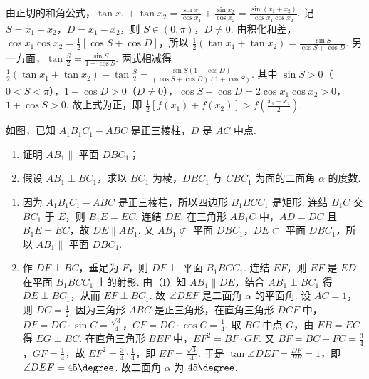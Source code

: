 \begin{solution}
由正切的和角公式，\(\tan x_1 + \tan x_2 = \frac{\sin x_1}{\cos x_1} + \frac{\sin x_2}{\cos x_2} = \frac{\sin \left(x_1 + x_2\right)}{\cos x_1 \cos x_2}\). 记 \(S = x_1 + x_2\)，\(D = x_1 - x_2\)，则 \(S \in (0, \pi)\)，\(D \neq 0\). 由积化和差，\(\cos x_1 \cos x_2 = \frac{1}{2}\left[\cos S + \cos D\right]\)，所以 \(\frac{1}{2}\left(\tan x_1 + \tan x_2\right) = \frac{\sin S}{\cos S + \cos D}\). 另一方面，\(\tan \frac{S}{2} = \frac{\sin S}{1 + \cos S}\). 两式相减得 \(\frac{1}{2}\left(\tan x_1 + \tan x_2\right) - \tan \frac{S}{2} = \frac{\sin S\left(1 - \cos D\right)}{\left(\cos S + \cos D\right)\left(1 + \cos S\right)}\). 其中 \(\sin S > 0\)（\(0 < S < \pi\)），\(1 - \cos D > 0\)（\(D \neq 0\)），\(\cos S + \cos D = 2\cos x_1 \cos x_2 > 0\)，\(1 + \cos S > 0\). 故上式为正，即 \(\frac{1}{2}\left[f(x_1) + f(x_2)\right] > f\left(\frac{x_1 + x_2}{2}\right)\).
\end{solution}

\begin{problem}
如图，已知 \(A_{1}B_{1}C_{1} - ABC\) 是正三棱柱，\(D\) 是 \(AC\) 中点.

\begin{enumerate}
\item 证明 \(AB_1 \parallel\) 平面 \(DBC_1\)；
\item 假设 \(AB_1 \perp BC_1\)，求以 \(BC_1\) 为棱，\(DBC_1\) 与 \(CBC_1\) 为面的二面角 \(\alpha\) 的度数.
\end{enumerate}

\end{problem}

\begin{solution}
\begin{enumerate}
\item 因为 \(A_{1}B_{1}C_{1} - ABC\) 是正三棱柱，所以四边形 \(B_1BCC_1\) 是矩形. 连结 \(B_1C\) 交 \(BC_1\) 于 \(E\)，则 \(B_1E = EC\). 连结 \(DE\). 在三角形 \(AB_1C\) 中，\(AD = DC\) 且 \(B_1E = EC\)，故 \(DE \parallel AB_1\). 又 \(AB_1 \not\subset\) 平面 \(DBC_1\)，\(DE \subset\) 平面 \(DBC_1\)，所以 \(AB_1 \parallel\) 平面 \(DBC_1\).
\item 作 \(DF \perp BC\)，垂足为 \(F\)，则 \(DF \perp\) 平面 \(B_1BCC_1\). 连结 \(EF\)，则 \(EF\) 是 \(ED\) 在平面 \(B_1BCC_1\) 上的射影. 由（I）知 \(AB_1 \parallel DE\)，结合 \(AB_1 \perp BC_1\) 得 \(DE \perp BC_1\)，从而 \(EF \perp BC_1\). 故 \(\angle DEF\) 是二面角 \(\alpha\) 的平面角. 设 \(AC = 1\)，则 \(DC = \frac{1}{2}\). 因为三角形 \(ABC\) 是正三角形，在直角三角形 \(DCF\) 中，\(DF = DC \cdot \sin C = \frac{\sqrt{3}}{4}\)，\(CF = DC \cdot \cos C = \frac{1}{4}\). 取 \(BC\) 中点 \(G\)，由 \(EB = EC\) 得 \(EG \perp BC\). 在直角三角形 \(BEF\) 中，\(EF^2 = BF \cdot GF\). 又 \(BF = BC - FC = \frac{3}{4}\)，\(GF = \frac{1}{4}\)，故 \(EF^2 = \frac{3}{4} \cdot \frac{1}{4}\)，即 \(EF = \frac{\sqrt{3}}{4}\). 于是 \(\tan \angle DEF = \frac{DF}{EF} = 1\)，即 \(\angle DEF = 45\degree\). 故二面角 \(\alpha\) 为 \(45\degree\).
\end{enumerate}
\end{solution}

